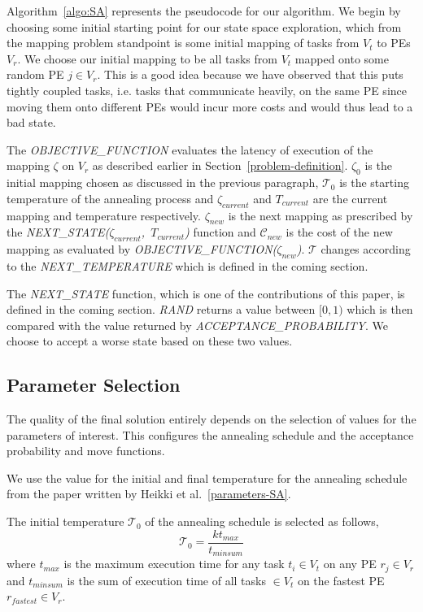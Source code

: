 Algorithm~\ref{algo:SA} represents the pseudocode for our algorithm. We begin by
choosing some initial starting point for our state space exploration, which from
the mapping problem standpoint is some initial mapping of tasks from $V_t$ to
PEs $V_r$. We choose our initial mapping to be all tasks from $V_t$ mapped onto
some random PE $j \in V_r$. This is a good idea because we have observed that
this puts tightly coupled tasks, i.e. tasks that communicate heavily, on the
same PE since moving them onto different PEs would incur more costs and would thus
lead to a bad state.

The \textit{OBJECTIVE\_FUNCTION} evaluates the latency of execution of the
mapping $\zeta$ on $V_r$ as described earlier in
Section~\ref{problem-definition}. $\zeta_0$ is the initial mapping chosen as
discussed in the previous paragraph, $\mathcal{T}_0$ is the starting
temperature of the annealing process and $\zeta_{current}$ and $T_{current}$ are
the current mapping and temperature respectively. $\zeta_{new}$ is the next
mapping as prescribed by the \mbox{\textit{NEXT\_STATE($\zeta_{current}$,
$T_{current}$)}} function and $\mathcal{C}_{new}$ is the cost of the new mapping
as evaluated by \textit{OBJECTIVE\_FUNCTION($\zeta_{new}$)}. $\mathcal{T}$
changes according to the \textit{NEXT\_TEMPERATURE} which is defined in the
coming section.

The \textit{NEXT\_STATE} function, which is one of the contributions of this
paper, is defined in the coming section. \textit{RAND} returns a value between
$[0, 1)$ which is then compared with the value returned by
\textit{ACCEPTANCE\_PROBABILITY}. We choose to accept a worse state based on
these two values.

\subsection{Parameter Selection}
The quality of the final solution entirely depends on the selection of values
for the parameters of interest. This configures the annealing schedule and the
acceptance probability and move functions.

We use the value for the initial and final temperature for the annealing
schedule from the paper written by Heikki et al.~\ref{parameters-SA}. 

The initial temperature $\mathcal{T}_0$ of the annealing schedule is selected as follows,
\begin{equation}
\mathcal{T}_0 = \frac{kt_{max}}{t_{minsum}}
\end{equation}
where $t_{max}$ is the maximum execution time for any task $t_i \in V_t$ on any
PE $r_j \in V_r$ and $t_{minsum}$ is the sum of execution time of all tasks $\in
V_t$ on the fastest PE $r_{fastest} \in V_r$.

